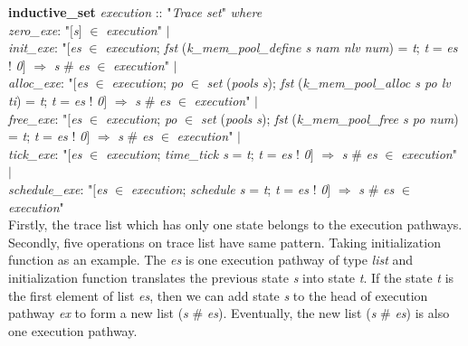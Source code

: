 \documentclass[runningheads]{llncs}
\begin{document}
\phantom{x} \textbf{inductive\_set} \textsl{execution} :: "\textsl{Trace set}" \textsl{where} \\
\phantom{x} \hspace{3pt} \textsl{zero\_exe}: "$\lbrack$\textsl{s}$\rbrack$ $\in$ \textsl{execution}" $\mid$ \\
\phantom{x} \hspace{3pt} \textsl{init\_exe}: "$\lbrack$\textsl{es} $\in$ \textsl{execution}; \textsl{fst} (\textsl{k\_mem\_pool\_define s nam nlv num}) = \textsl{t}; \textsl{t} = \textsl{es} ! \textsl{0}$\rbrack$ $\Longrightarrow$ \textsl{s} \# \textsl{es} $\in$ \textsl{execution}" $\mid$ \\
\phantom{x} \hspace{3pt} \textsl{alloc\_exe}: "$\lbrack$\textsl{es} $\in$ \textsl{execution}; \textsl{po} $\in$ \textsl{set} (\textsl{pools s}); \textsl{fst} (\textsl{k\_mem\_pool\_alloc s po lv ti}) = \textsl{t}; \textsl{t} = \textsl{es} ! \textsl{0}$\rbrack$ $\Longrightarrow$ \textsl{s} \# \textsl{es} $\in$ \textsl{execution}" $\mid$ \\
\phantom{x} \hspace{3pt} \textsl{free\_exe}: "$\lbrack$\textsl{es} $\in$ \textsl{execution}; \textsl{po} $\in$ \textsl{set} (\textsl{pools s}); \textsl{fst} (\textsl{k\_mem\_pool\_free s po num}) = \textsl{t}; \textsl{t} = \textsl{es} ! \textsl{0}$\rbrack$ $\Longrightarrow$ \textsl{s} \# \textsl{es} $\in$ \textsl{execution}" $\mid$ \\
\phantom{x} \hspace{3pt} \textsl{tick\_exe}: "$\lbrack$\textsl{es} $\in$ \textsl{execution}; \textsl{time\_tick s} = \textsl{t}; \textsl{t} = \textsl{es} ! \textsl{0}$\rbrack$ $\Longrightarrow$ \textsl{s} \# \textsl{es} $\in$ \textsl{execution}" $\mid$ \\
\phantom{x} \hspace{3pt} \textsl{schedule\_exe}: "$\lbrack$\textsl{es} $\in$ \textsl{execution}; \textsl{schedule s} = \textsl{t}; \textsl{t} = \textsl{es} ! \textsl{0}$\rbrack$ $\Longrightarrow$ \textsl{s} \# \textsl{es} $\in$ \textsl{execution}" \\

Firstly, the trace list which has only one state belongs to the execution pathways. Secondly, five operations on trace list have same pattern. Taking initialization function as an example. The \textsl{es} is one execution pathway of type \textsl{list} and initialization function translates the previous state \textsl{s} into state \textsl{t}. If the state \textsl{t} is the first element of list \textsl{es}, then we can add state \textsl{s} to the head of execution pathway \textsl{ex} to form a new list (\textsl{s} \# \textsl{es}). Eventually, the new list (\textsl{s} \# \textsl{es}) is also one execution pathway.
\end{document}

